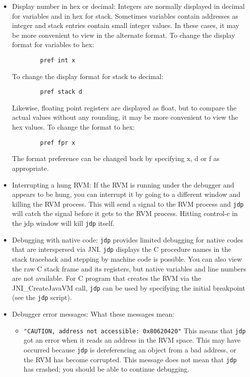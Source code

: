 \begin{itemize}
\item Display number in hex or decimal:
  Integers are normally displayed in decimal for variables and
  in hex for stack.  Sometimes variables contain addresses as 
  integer and stack entries contain small integer values.    In
  these cases, it may be more convenient to view in the alternate
  format.
  To change the display format for variables to hex:
\begin{verbatim}
        pref int x
\end{verbatim}
  To change the display format for stack to decimal:
\begin{verbatim}
        pref stack d
\end{verbatim}
  Likewise, floating point registers are displayed as float, but
  to compare the actual values without any rounding, it may be more
  convenient to view the hex values.  To change the format to hex:
\begin{verbatim}
        pref fpr x
\end{verbatim}

  The format preference can be changed back by specifying x, d or f
  as appropriate.

\item Interrupting a hung RVM:  If the RVM is running under the debugger
  and appears to be hung, you can interrupt it by going to a different
  window and killing the RVM process.  This will send a signal to the
  RVM process and {\tt jdp} will catch the signal before it gets to
  the RVM process.  Hitting control-c in the jdp window will kill 
  {\tt jdp} itself.


\item Debugging with native code:  {\tt jdp} provides limited debugging
  for native codes that are interspersed via JNI.  {\tt jdp}
  displays the C procedure names in the stack traceback and stepping by 
  machine code is possible.  You can also view the raw C stack frame and 
  its registers, but native variables and line numbers are not available.
  For C program that creates the RVM via the JNI\_CreateJavaVM call, 
  {\tt jdp} can be used by specifying the initial breakpoint (see the 
  {\tt jdp} script).




\item Debugger error messages:
  What these messages mean:

\begin{itemize}
\item {\tt "CAUTION, address not accessible: 0x80620420"}
        This means that {\tt jdp} got an error when it reads an address
        in the RVM space.  This may have occurred because {\tt jdp} is 
        dereferencing an object from a bad address, or the RVM has
        become corrupted.  This message does not mean that {\tt jdp}
        has crashed; you should be able to continue debugging.


\end{itemize}
\end{itemize}
